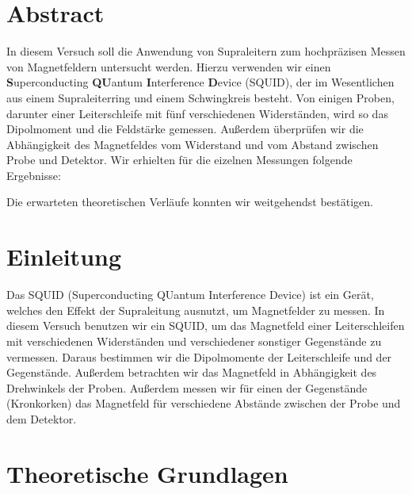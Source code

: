 \documentclass[12pt]{article}
\title{\vspace{0cm}{\Huge Fortgeschrittenen-Praktikum I:\\ \vspace{1cm} SQUID}}
\author{Saskia Bondza\\Simon Stephan}
\date{durchgeführt am 23.09.2016}
\begin{document}
\maketitle
\newpage

\section*{Abstract}

In diesem Versuch soll die Anwendung von Supraleitern zum hochpräzisen  Messen von Magnetfeldern untersucht werden. Hierzu verwenden wir einen \textbf{S}uperconducting \textbf{QU}antum \textbf{I}nterference \textbf{D}evice (SQUID), der im Wesentlichen aus einem Supraleiterring und einem Schwingkreis besteht. Von einigen Proben, darunter einer Leiterschleife mit fünf verschiedenen Widerständen, wird so das Dipolmoment und die Feldstärke gemessen. Außerdem überprüfen wir die Abhängigkeit des Magnetfeldes vom Widerstand und vom Abstand zwischen Probe und Detektor.
Wir erhielten für die eizelnen Messungen folgende Ergebnisse:



Die erwarteten theoretischen Verläufe konnten wir weitgehendst bestätigen.

\newpage

\thispagestyle{empty}
\tableofcontents
\newpage

\section{Einleitung}

Das SQUID (Superconducting QUantum Interference Device) ist ein Gerät, welches den Effekt der Supraleitung ausnutzt, um Magnetfelder zu messen. In diesem Versuch benutzen wir ein SQUID, um das Magnetfeld einer Leiterschleifen mit verschiedenen Widerständen und verschiedener sonstiger Gegenstände zu vermessen. Daraus bestimmen wir die Dipolmomente der Leiterschleife und der Gegenstände. Außerdem betrachten wir das Magnetfeld in Abhängigkeit des Drehwinkels der Proben. Außerdem messen wir für einen der Gegenstände (Kronkorken) das Magnetfeld für verschiedene Abstände zwischen der Probe und dem Detektor.


\newpage
\section{Theoretische Grundlagen}
\end{document}
